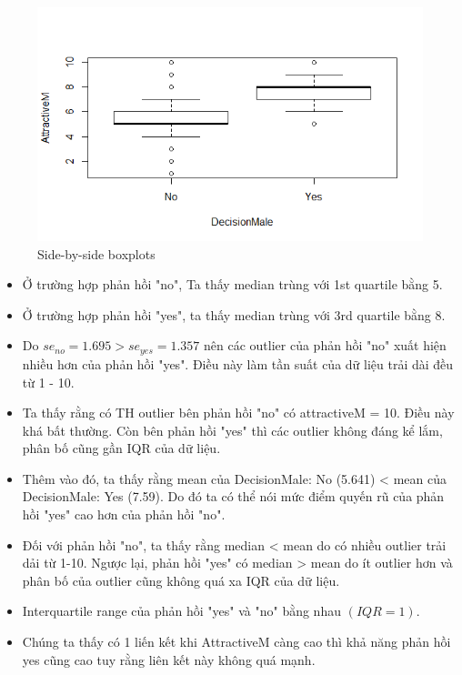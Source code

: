 \documentclass[a4paper,12pt]{article}
\begin{document}
	\begin{figure}[H]
		\centering
		\includegraphics[width=0.8\linewidth]{Images/boxplot}
		\caption{Side-by-side boxplots}
		\label{fig:boxplot}
	\end{figure}
	
	\begin{itemize}
		\item Ở trường hợp phản hồi "no", Ta thấy median trùng với 1st quartile bằng 5.
		\item Ở trường hợp phản hồi "yes", ta thấy median trùng với 3rd quartile bằng 8.
		\item Do $se_{no} = 1.695 > se_{yes} = 1.357$ nên các outlier của phản hồi "no" xuất hiện nhiều hơn của phản hồi "yes". Điều này làm tần suất của dữ liệu trải dài đều từ 1 - 10.
		\item Ta thấy rằng có TH outlier bên phản hồi "no" có attractiveM = 10. Điều này khá bất thường. Còn bên phản hồi "yes" thì các outlier không đáng kể lắm, phân bố cũng gần IQR của dữ liệu.

		\item Thêm vào đó, ta thấy rằng mean của DecisionMale: No (5.641) < mean của DecisionMale: Yes (7.59). Do đó ta có thể nói mức điểm quyến rũ của phản hồi "yes" cao hơn của phản hồi "no".
		
		\item Đối với phản hồi "no", ta thấy rằng median < mean do có nhiều outlier trải dải từ 1-10. Ngược lại, phản hồi "yes" có median > mean do ít outlier hơn và phân bố của outlier cũng không quá xa IQR của dữ liệu.
		
		\item Interquartile range của phản hồi "yes" và "no" bằng nhau $(IQR = 1)$.
		
		\item Chúng ta thấy có 1 liến kết khi AttractiveM càng cao thì khả năng phản hồi yes cũng cao tuy rằng liên kết này không quá mạnh.
	\end{itemize}
	
\end{document}
